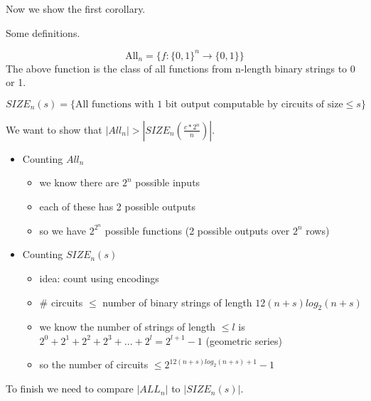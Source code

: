 \hr

Now we show the first corollary.

{
Some definitions.

\[
    \text{All}_n = \{ f:\{0,1\}^n \rightarrow \{0, 1\} \}
\]
The above function is the class of all functions from n-length binary strings to 0 or 1.

\[
    SIZE_n(s) = \{ \text{All functions with 1 bit output computable by circuits of size} \le s \}
\]

We want to show that $|All_n| > |SIZE_n(\frac{c*2^n}{n})|$.
\begin{itemize}
    \item Counting $All_n$
    \begin{itemize}
        \item we know there are $2^n$ possible inputs
        \item each of these has 2 possible outputs
        \item so we have $2^{2^n}$ possible functions (2 possible outputs over $2^n$ rows)
    \end{itemize}
    \item Counting $SIZE_n(s)$
    \begin{itemize}
        \item idea: count using encodings
        \item \# circuits $\le$ number of binary strings of length $12(n + s)log_2(n + s)$
        \item we know the number of strings of length $\le l$ is $2^0 + 2^1 + 2^2 + 2^3 + ... + 2^l = 2^{l + 1} - 1$ (geometric series)
        \item so the number of circuits $\le 2^{12(n+s)log_2(n+s) + 1} - 1$
    \end{itemize}
\end{itemize}

To finish we need to compare $|ALL_n|$ to $|SIZE_n(s)|$.
}







